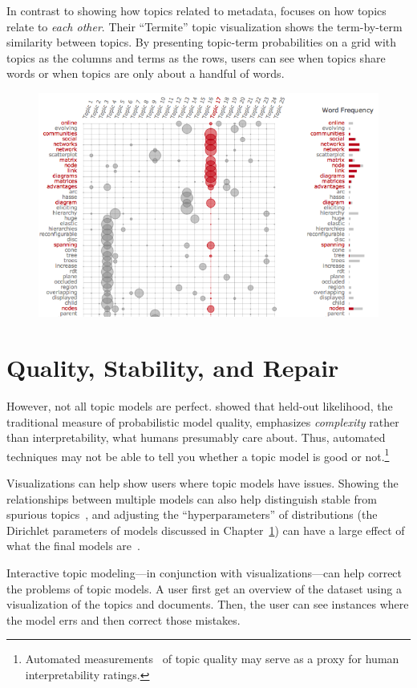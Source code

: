 In contrast to showing how topics related to metadata, \citet{chuang-12} focuses
on how topics relate to \emph{each other}.  Their ``Termite'' topic
visualization shows the term-by-term similarity between topics.  By presenting
topic-term probabilities on a grid with topics as the columns and terms as the
rows, users can see when topics share words or when topics are only about a
handful of words.

\begin{figure}
  \includegraphics[width=.9\linewidth]{figures/viz_termite}
\end{figure}

\section{Quality, Stability, and Repair}

However, not all topic models are perfect.  \citet{chang-09b} showed that
held-out likelihood, the traditional measure of probabilistic model quality,
emphasizes \emph{complexity} rather than interpretability, what humans
presumably care about.  Thus, automated techniques may not be able to tell you
whether a topic model is good or not.\footnote{Automated
  measurements~\citep{newman-10,mimno-11,lau-14} of topic quality may serve as a
  proxy for human interpretability ratings.}

Visualizations can help show users where topic models have issues.  Showing the
relationships between multiple models can also help distinguish stable from
spurious topics~\citep{chuang-15}, and adjusting the ``hyperparameters'' of
distributions (the Dirichlet parameters of models discussed in Chapter~\ref{})
can have a large effect of what the final models are~\cite{wallach-09b}.

Interactive topic modeling---in conjunction with visualizations---can help
correct the problems of topic models.  A user first get an overview of the
dataset using a visualization of the topics and documents.  Then, the user can
see instances where the model errs and then correct those mistakes.

